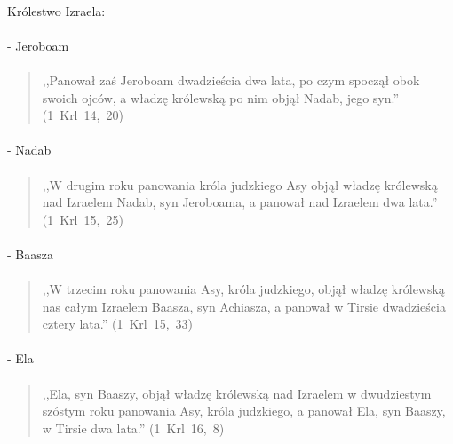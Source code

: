 \documentclass[10pt,a4paper,oneside]{article}
\begin{document}
\paragraph{}
Królestwo Izraela:
\paragraph{}
- Jeroboam
\paragraph{}
\begin{quote}
,,Panował zaś Jeroboam dwadzieścia dwa lata, po czym spoczął obok swoich ojców, a władzę królewską po nim objął Nadab, jego syn.'' \mbox{(1 Krl 14, 20)}
\end{quote}
\paragraph{}
- Nadab
\paragraph{}
\begin{quote}
,,W drugim roku panowania króla judzkiego Asy objął władzę królewską nad Izraelem Nadab, syn Jeroboama, a panował nad Izraelem dwa lata.'' \mbox{(1 Krl 15, 25)}
\end{quote}
\paragraph{}
- Baasza
\paragraph{}
\begin{quote}
,,W trzecim roku panowania Asy, króla judzkiego, objął władzę królewską nas całym Izraelem Baasza, syn Achiasza, a panował w Tirsie dwadzieścia cztery lata.'' \mbox{(1 Krl 15, 33)}
\end{quote}
\paragraph{}
- Ela
\paragraph{}
\begin{quote}
,,Ela, syn Baaszy, objął władzę królewską nad Izraelem w dwudziestym szóstym roku panowania Asy, króla judzkiego, a panował Ela, syn Baaszy, w Tirsie dwa lata.'' \mbox{(1 Krl 16, 8)}
\end{quote}
\end{document}
